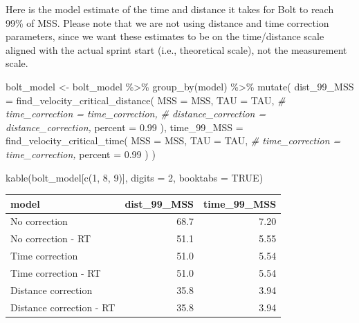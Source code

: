 \documentclass[fleqn,10pt]{wlpeerj} %
\newenvironment{Shaded}{\begin{snugshade}}{\end{snugshade}}
\newcommand{\AttributeTok}[1]{\textcolor[rgb]{0.77,0.63,0.00}{#1}}
\newcommand{\CommentTok}[1]{\textcolor[rgb]{0.56,0.35,0.01}{\textit{#1}}}
\newcommand{\ConstantTok}[1]{\textcolor[rgb]{0.00,0.00,0.00}{#1}}
\newcommand{\DecValTok}[1]{\textcolor[rgb]{0.00,0.00,0.81}{#1}}
\newcommand{\FloatTok}[1]{\textcolor[rgb]{0.00,0.00,0.81}{#1}}
\newcommand{\FunctionTok}[1]{\textcolor[rgb]{0.00,0.00,0.00}{#1}}
\newcommand{\NormalTok}[1]{#1}
\newcommand{\OtherTok}[1]{\textcolor[rgb]{0.56,0.35,0.01}{#1}}
\newcommand{\SpecialCharTok}[1]{\textcolor[rgb]{0.00,0.00,0.00}{#1}}
\begin{document}
\normalsize

Here is the model estimate of the time and distance it takes for Bolt to reach 99\% of MSS. Please note that we are not using distance and time correction parameters, since we want these estimates to be on the time/distance scale aligned with the actual sprint start (i.e., theoretical scale), not the measurement scale.

\small

\begin{Shaded}
\begin{Highlighting}[]
\NormalTok{bolt\_model }\OtherTok{\textless{}{-}}\NormalTok{ bolt\_model }\SpecialCharTok{\%\textgreater{}\%}
  \FunctionTok{group\_by}\NormalTok{(model) }\SpecialCharTok{\%\textgreater{}\%}
  \FunctionTok{mutate}\NormalTok{(}
    \AttributeTok{dist\_99\_MSS =} \FunctionTok{find\_velocity\_critical\_distance}\NormalTok{(}
      \AttributeTok{MSS =}\NormalTok{ MSS, }\AttributeTok{TAU =}\NormalTok{ TAU,}
      \CommentTok{\# time\_correction = time\_correction,}
      \CommentTok{\# distance\_correction = distance\_correction,}
      \AttributeTok{percent =} \FloatTok{0.99}
\NormalTok{    ),}
    \AttributeTok{time\_99\_MSS =} \FunctionTok{find\_velocity\_critical\_time}\NormalTok{(}
      \AttributeTok{MSS =}\NormalTok{ MSS, }\AttributeTok{TAU =}\NormalTok{ TAU,}
      \CommentTok{\# time\_correction = time\_correction,}
      \AttributeTok{percent =} \FloatTok{0.99}
\NormalTok{    )}
\NormalTok{  )}

\FunctionTok{kable}\NormalTok{(bolt\_model[}\FunctionTok{c}\NormalTok{(}\DecValTok{1}\NormalTok{, }\DecValTok{8}\NormalTok{, }\DecValTok{9}\NormalTok{)], }\AttributeTok{digits =} \DecValTok{2}\NormalTok{, }\AttributeTok{booktabs =} \ConstantTok{TRUE}\NormalTok{)}
\end{Highlighting}
\end{Shaded}

\begin{tabular}{lrr}
\toprule
model & dist\_99\_MSS & time\_99\_MSS\\
\midrule
No correction & 68.7 & 7.20\\
No correction - RT & 51.1 & 5.55\\
Time correction & 51.0 & 5.54\\
Time correction - RT & 51.0 & 5.54\\
Distance correction & 35.8 & 3.94\\
\addlinespace
Distance correction - RT & 35.8 & 3.94\\
\bottomrule
\end{tabular}
\end{document}
